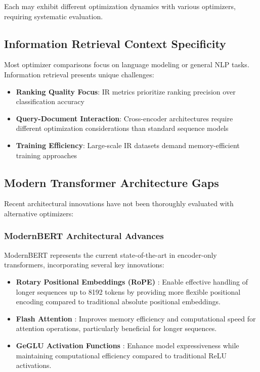 Each may exhibit different optimization dynamics with various optimizers, requiring systematic evaluation.

\subsection{Information Retrieval Context Specificity}

Most optimizer comparisons focus on language modeling or general NLP tasks. Information retrieval presents unique challenges:
\begin{itemize}
    \item \textbf{Ranking Quality Focus}: IR metrics prioritize ranking precision over classification accuracy
    \item \textbf{Query-Document Interaction}: Cross-encoder architectures require different optimization considerations than standard sequence models
    \item \textbf{Training Efficiency}: Large-scale IR datasets demand memory-efficient training approaches
\end{itemize}

\subsection{Modern Transformer Architecture Gaps}

Recent architectural innovations have not been thoroughly evaluated with alternative optimizers:

\subsubsection{ModernBERT Architectural Advances}
ModernBERT \cite{modernbert} represents the current state-of-the-art in encoder-only transformers, incorporating several key innovations:

\begin{itemize}
    \item \textbf{Rotary Positional Embeddings (RoPE)} \cite{su2023roformerenhancedtransformerrotary}: Enable effective handling of longer sequences up to 8192 tokens by providing more flexible positional encoding compared to traditional absolute positional embeddings.
    \item \textbf{Flash Attention} \cite{dao2022flashattentionfastmemoryefficientexact}: Improves memory efficiency and computational speed for attention operations, particularly beneficial for longer sequences.
    \item \textbf{GeGLU Activation Functions} \cite{shazeer2020gluvariantsimprovetransformer}: Enhance model expressiveness while maintaining computational efficiency compared to traditional ReLU activations.
\end{itemize}

